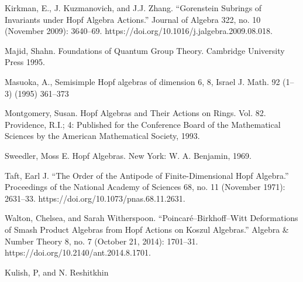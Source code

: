 \documentclass[12pt,a4paper]{article}
\newcommand\1{_{(1)}}
\newcommand\2{_{(2)}}
\begin{document}
\begin{thebibliography}{99}
Kirkman, E., J. Kuzmanovich, and J.J. Zhang. “Gorenstein Subrings of Invariants under Hopf Algebra Actions.” Journal of Algebra 322, no. 10 (November 2009): 3640–69. https://doi.org/10.1016/j.jalgebra.2009.08.018.

Majid, Shahn. Foundations of Quantum Group Theory. Cambridge University Press 1995.

Masuoka, A., Semisimple Hopf algebras of dimension 6, 8, Israel J. Math. 92 (1–3) (1995) 361–373

Montgomery, Susan. Hopf Algebras and Their Actions on Rings. Vol. 82. Providence, R.I.; 4: Published for the Conference Board of the Mathematical Sciences by the American Mathematical Society, 1993.

Sweedler, Moss E. Hopf Algebras. New York: W. A. Benjamin, 1969.

Taft, Earl J. “The Order of the Antipode of Finite-Dimensional Hopf Algebra.” Proceedings of the National Academy of Sciences 68, no. 11 (November 1971): 2631–33. https://doi.org/10.1073/pnas.68.11.2631.

Walton, Chelsea, and Sarah Witherspoon. “Poincaré–Birkhoff–Witt Deformations of Smash Product Algebras from Hopf Actions on Koszul Algebras.” Algebra \& Number Theory 8, no. 7 (October 21, 2014): 1701–31. https://doi.org/10.2140/ant.2014.8.1701.

Kulish, P, and N. Reshitkhin

\end{thebibliography}
\end{document}
